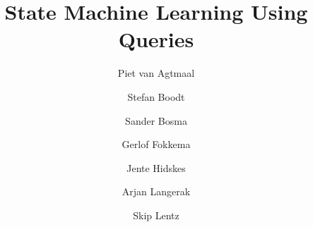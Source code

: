 \documentclass[a4paper,twoside]{article}
\title{State Machine Learning Using Queries}
\author{%
Piet van Agtmaal \and
Stefan Boodt \and
Sander Bosma \and
Gerlof Fokkema \and
Jente Hidskes \and
Arjan Langerak \and
Skip Lentz}
\date{}
\begin{document}
\maketitle





















{}


\end{document}
